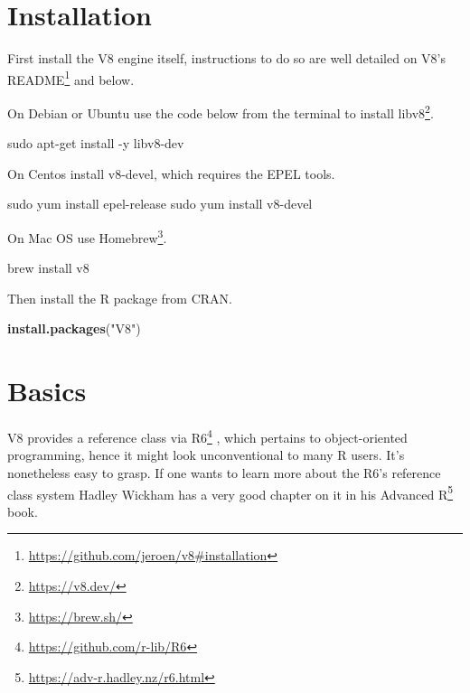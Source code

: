 \documentclass[
]{krantz}
\makeatletter
\newenvironment{Shaded}{\begin{snugshade}}{\end{snugshade}}
\newcommand{\ExtensionTok}[1]{#1}
\newcommand{\FunctionTok}[1]{\textcolor[rgb]{0,0,0}{#1}}
\newcommand{\KeywordTok}[1]{\textcolor[rgb]{0.27,0.27,0.27}{\textbf{#1}}}
\newcommand{\NormalTok}[1]{#1}
\newcommand{\StringTok}[1]{\textcolor[rgb]{0.5,0.5,0.5}{#1}}
\renewcommand{\href}[2]{#2\footnote{\url{#1}}}
\newenvironment{kframe}{%
\medskip{}
\setlength{\fboxsep}{.8em}
 \def\at@end@of@kframe{}%
 \ifinner\ifhmode%
  \def\at@end@of@kframe{\end{minipage}}%
  \begin{minipage}{\columnwidth}%
 \fi\fi%
 \def\FrameCommand##1{\hskip\@totalleftmargin \hskip-\fboxsep
 \colorbox{shadecolor}{##1}\hskip-\fboxsep
     \hskip-\linewidth \hskip-\@totalleftmargin \hskip\columnwidth}%
 \MakeFramed {\advance\hsize-\width
   \@totalleftmargin\z@ \linewidth\hsize
   \@setminipage}}%
 {\par\unskip\endMakeFramed%
 \at@end@of@kframe}
\renewenvironment{Shaded}{\begin{kframe}}{\end{kframe}}
\makeatother
\begin{document}
\hypertarget{installation}{%
\section*{Installation}\label{installation}}


First install the V8 engine itself, instructions to do so are well detailed on \href{https://github.com/jeroen/v8\#installation}{V8's README} and below.

On Debian or Ubuntu use the code below from the terminal to install \href{https://v8.dev/}{libv8}.

\begin{Shaded}
\begin{Highlighting}[]
\FunctionTok{sudo}\NormalTok{ apt{-}get install {-}y libv8{-}dev}
\end{Highlighting}
\end{Shaded}

On Centos install v8-devel, which requires the EPEL tools.

\begin{Shaded}
\begin{Highlighting}[]
\FunctionTok{sudo}\NormalTok{ yum install epel{-}release}
\FunctionTok{sudo}\NormalTok{ yum install v8{-}devel}
\end{Highlighting}
\end{Shaded}

On Mac OS use \href{https://brew.sh/}{Homebrew}.

\begin{Shaded}
\begin{Highlighting}[]
\ExtensionTok{brew}\NormalTok{ install v8}
\end{Highlighting}
\end{Shaded}

Then install the R package from CRAN.

\begin{Shaded}
\begin{Highlighting}[]
\KeywordTok{install.packages}\NormalTok{(}\StringTok{"V8"}\NormalTok{)}
\end{Highlighting}
\end{Shaded}

\hypertarget{basics}{%
\section*{Basics}\label{basics}}


V8 provides a reference class via \href{https://github.com/r-lib/R6}{R6} \citep{R-R6}, which pertains to object-oriented programming, hence it might look unconventional to many R users. It's nonetheless easy to grasp. If one wants to learn more about the R6's reference class system Hadley Wickham has a very good chapter on it in his \href{https://adv-r.hadley.nz/r6.html}{Advanced R} book.
\end{document}
